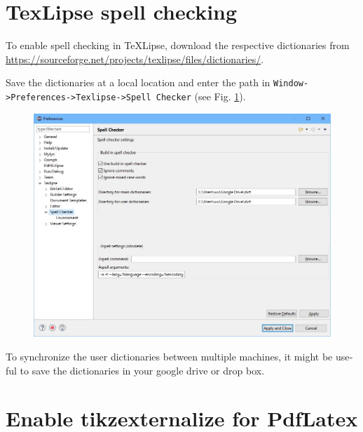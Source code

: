 \begin{otherlanguage}{english}
\section{TexLipse spell checking}
%
To enable spell checking in TeXLipse, download the respective dictionaries from 
\url{https://sourceforge.net/projects/texlipse/files/dictionaries/}.

Save the dictionaries at a local location and enter the path in \texttt{Window->Preferences->Tex\-lipse->Spell Checker} (see Fig. \ref{fig:dict_path}).
%
\begin{figure}[htb]
	\centering
	\includegraphics[scale=0.40]{images/Spell_Checker_preferences.jpg}
	\label{fig:dict_path}
\end{figure}

To synchronize the user dictionaries between multiple machines, it might be useful to save the dictionaries in your google drive or drop box.

\section{Enable tikzexternalize for PdfLatex}


\end{otherlanguage}
